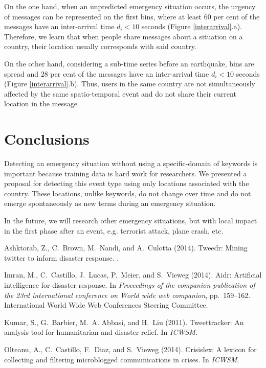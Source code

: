 \documentclass{ewic}
\begin{document}
On the one hand, when an unpredicted emergency situation occurs, the urgency of messages can be represented on the first bins, where at least $60$ per cent of the messages have an inter-arrival time $d_{i} < 10$ seconds (Figure \ref{interarrival}.a). Therefore, we learn that when people share messages about a situation on a country, their location usually corresponds with said country.

On the other hand, considering a sub-time series before an earthquake, bins are spread and $28$ per cent of the messages have an inter-arrival time $d_{i} < 10$ seconds (Figure \ref{interarrival}.b). Thus, users in the same country are not simultaneously affected by the same spatio-temporal event and do not share their current location in the message.
\section{Conclusions}
Detecting an emergency situation without using a specific-domain of keywords is important because training data is hard work for researchers. We presented a proposal for detecting this event type using only locations associated with the country. These locations, unlike keywords, do not change over time and do not emerge spontaneously as new terms during an emergency situation.

In the future, we will research other emergency situations, but with local impact in the first phase after an event, e.g. terrorist attack, plane crash, etc.

\begin{thebibliography}{9}

%
%

Ashktorab, Z., C.~Brown, M.~Nandi, and A.~Culotta (2014).
\newblock Tweedr: Mining twitter to inform disaster response.
.

Imran, M., C.~Castillo, J.~Lucas, P.~Meier, and S.~Vieweg (2014).
\newblock Aidr: Artificial intelligence for disaster response.
\newblock In {\em Proceedings of the companion publication of the 23rd
	international conference on World wide web companion}, pp.\  159--162.
International World Wide Web Conferences Steering Committee.

Kumar, S., G.~Barbier, M.~A. Abbasi, and H.~Liu (2011).
\newblock Tweettracker: An analysis tool for humanitarian and disaster relief.
\newblock In {\em ICWSM}.

Olteanu, A., C.~Castillo, F.~Diaz, and S.~Vieweg (2014).
\newblock Crisislex: A lexicon for collecting and filtering microblogged
communications in crises.
\newblock In {\em ICWSM}.

\end{thebibliography}
\end{document}
